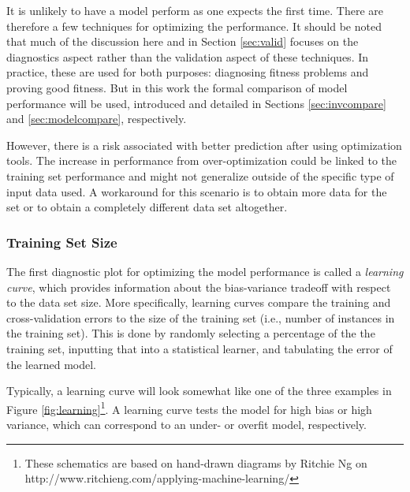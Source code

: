 It is unlikely to have a model perform as one expects the first time. There are
therefore a few techniques for optimizing the performance. It should be noted
that much of the discussion here and in Section \ref{sec:valid} focuses on the
diagnostics aspect rather than the validation aspect of these
techniques. In practice,
these are used for both purposes: diagnosing fitness problems and proving good fitness. 
But in this work the formal comparison of
model performance will be used, introduced and detailed in Sections
\ref{sec:invcompare} and \ref{sec:modelcompare}, respectively. 

However, there is a risk associated with better prediction after using
optimization tools.  The increase in performance from over-optimization could
be linked to the training set performance and might not generalize outside of
the specific type of input data used.  A workaround for this scenario is to
obtain more data for the set or to obtain a completely different data set
altogether. 

\subsubsection{Training Set Size}

The first diagnostic plot for optimizing the model performance is called a
\textit{learning curve}, which provides information about the bias-variance
tradeoff with respect to the data set size. More specifically, learning curves
compare the training and cross-validation errors to the size of the training
set (i.e., number of instances in the training set). This is done by randomly
selecting a percentage of the the training set, inputting that into a
statistical learner, and tabulating the error of the learned model. 

Typically, a learning curve will look somewhat like one of the three examples
in Figure \ref{fig:learning}\footnote{These schematics are based on hand-drawn
diagrams by Ritchie Ng on http://www.ritchieng.com/applying-machine-learning/}.
A learning curve tests the model for high bias or high variance, which can
correspond to an under- or overfit model, respectively. 


